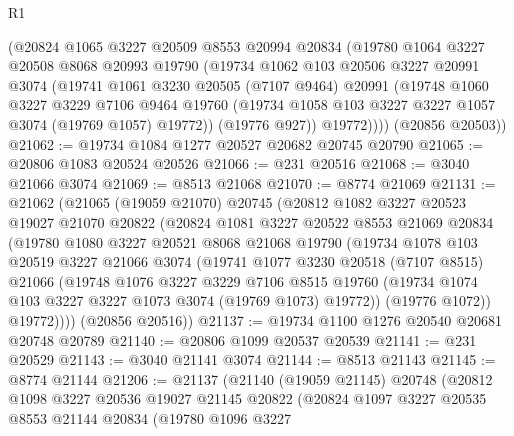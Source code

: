 \begin{lexlean}{R1}
\begin{coremodule}
        (@20824
          @1065
          @3227
          @20509
          @8553
          @20994
          @20834
          (@19780
            @1064
            @3227
            @20508
            @8068
            @20993
            @19790
            (@19734
              @1062
              @103
              @20506
              @3227
              @20991
              @3074
              (@19741
                @1061
                @3230
                @20505
                (@7107 @9464)
                @20991
                (@19748
                  @1060
                  @3227
                  @3229
                  @7106
                  @9464
                  @19760
                  (@19734 @1058 @103 @3227 @3227 @1057 @3074 (@19769 @1057) @19772))
                (@19776 @927))
              @19772))))
      (@20856 @20503))
@21062 := @19734 @1084 @1277 @20527 @20682 @20745 @20790
@21065 := @20806 @1083 @20524 @20526
@21066 := @231 @20516
@21068 := @3040 @21066 @3074
@21069 := @8513 @21068
@21070 := @8774 @21069
@21131 := @21062
    (@21065
      (@19059 @21070)
      @20745
      (@20812
        @1082
        @3227
        @20523
        @19027
        @21070
        @20822
        (@20824
          @1081
          @3227
          @20522
          @8553
          @21069
          @20834
          (@19780
            @1080
            @3227
            @20521
            @8068
            @21068
            @19790
            (@19734
              @1078
              @103
              @20519
              @3227
              @21066
              @3074
              (@19741
                @1077
                @3230
                @20518
                (@7107 @8515)
                @21066
                (@19748
                  @1076
                  @3227
                  @3229
                  @7106
                  @8515
                  @19760
                  (@19734 @1074 @103 @3227 @3227 @1073 @3074 (@19769 @1073) @19772))
                (@19776 @1072))
              @19772))))
      (@20856 @20516))
@21137 := @19734 @1100 @1276 @20540 @20681 @20748 @20789
@21140 := @20806 @1099 @20537 @20539
@21141 := @231 @20529
@21143 := @3040 @21141 @3074
@21144 := @8513 @21143
@21145 := @8774 @21144
@21206 := @21137
    (@21140
      (@19059 @21145)
      @20748
      (@20812
        @1098
        @3227
        @20536
        @19027
        @21145
        @20822
        (@20824
          @1097
          @3227
          @20535
          @8553
          @21144
          @20834
          (@19780
            @1096
            @3227

\end{coremodule}
\end{lexlean}
